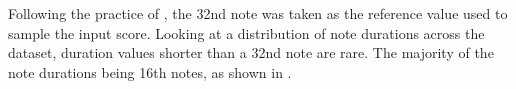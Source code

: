 
Following the practice of \textcite{micchi2020not}, the 32nd
note was taken as the reference value used to sample the
input score. Looking at a distribution of note durations
across the dataset, duration values shorter than a 32nd note
are rare. The majority of the note durations being 16th
notes, as shown in .

